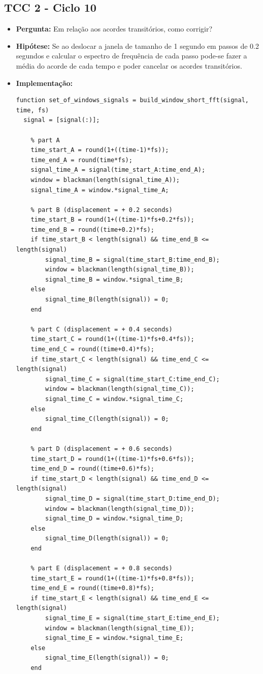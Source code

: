 \subsection{TCC 2 - Ciclo 10}
\begin{itemize}
\item \textbf{Pergunta:} Em relação aos acordes transitórios, como corrigir?
\item \textbf{Hipótese:} Se ao deslocar a janela de tamanho de 1 segundo em passos de 0.2 segundos e calcular o espectro de frequência de cada passo pode-se fazer a média do acorde de cada tempo e poder cancelar os acordes transitórios.
\item \textbf{Implementação:}
\begin{lstlisting}
function set_of_windows_signals = build_window_short_fft(signal, time, fs)
  signal = [signal(:)];

    % part A
    time_start_A = round(1+((time-1)*fs));
    time_end_A = round(time*fs);
    signal_time_A = signal(time_start_A:time_end_A);
    window = blackman(length(signal_time_A));
    signal_time_A = window.*signal_time_A;

    % part B (displacement = + 0.2 seconds)
    time_start_B = round(1+((time-1)*fs+0.2*fs));
    time_end_B = round((time+0.2)*fs);
    if time_start_B < length(signal) && time_end_B <= length(signal)
        signal_time_B = signal(time_start_B:time_end_B);
        window = blackman(length(signal_time_B));
        signal_time_B = window.*signal_time_B;
    else
        signal_time_B(length(signal)) = 0;
    end

    % part C (displacement = + 0.4 seconds)
    time_start_C = round(1+((time-1)*fs+0.4*fs));
    time_end_C = round((time+0.4)*fs);
    if time_start_C < length(signal) && time_end_C <= length(signal)
        signal_time_C = signal(time_start_C:time_end_C);
        window = blackman(length(signal_time_C));
        signal_time_C = window.*signal_time_C;
    else
        signal_time_C(length(signal)) = 0;
    end

    % part D (displacement = + 0.6 seconds)
    time_start_D = round(1+((time-1)*fs+0.6*fs));
    time_end_D = round((time+0.6)*fs);
    if time_start_D < length(signal) && time_end_D <= length(signal)
        signal_time_D = signal(time_start_D:time_end_D);
        window = blackman(length(signal_time_D));
        signal_time_D = window.*signal_time_D;
    else
        signal_time_D(length(signal)) = 0;
    end

    % part E (displacement = + 0.8 seconds)
    time_start_E = round(1+((time-1)*fs+0.8*fs));
    time_end_E = round((time+0.8)*fs);
    if time_start_E < length(signal) && time_end_E <= length(signal)
        signal_time_E = signal(time_start_E:time_end_E);
        window = blackman(length(signal_time_E));
        signal_time_E = window.*signal_time_E;
    else
        signal_time_E(length(signal)) = 0;
    end


\end{lstlisting}
\end{itemize}
